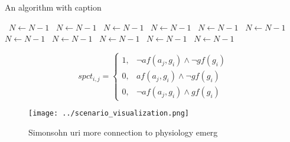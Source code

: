 \documentclass[a4paper]{article}
\begin{document}
\begin{algorithm}
\caption{An algorithm with caption}
\begin{algorithmic}
\    \State $N \gets N - 1$
\    \State $N \gets N - 1$
\    \State $N \gets N - 1$
\    \State $N \gets N - 1$
\    \State $N \gets N - 1$
\    \State $N \gets N - 1$
\    \State $N \gets N - 1$
\    \State $N \gets N - 1$
\    \State $N \gets N - 1$
\    \State $N \gets N - 1$
\    \State $N \gets N - 1$
\EndWhile
\end{algorithmic}
\end{algorithm}

\begin{equation}
spct_{i,j} =
\begin{cases}
1, & \text{$\neg af(a_j,g_i) \wedge \neg gf(g_i)$}\\
0, & \text{$af(a_j,g_i) \wedge \neg gf(g_i)$}\\
0, & \text{$\neg af(a_j,g_i) \wedge gf(g_i)$}
\end{cases}
\end{equation}

\begin{figure}
\centering
\texttt{[image: ../scenario\_visualization.png]}
\caption{Simonsohn uri more connection to physiology emerg
}
\end{figure}
 
\end{document}
